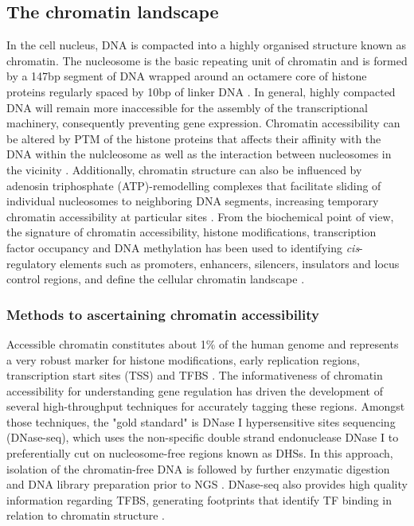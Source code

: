 \subsection{The chromatin landscape}
In the cell nucleus, DNA is compacted into a highly organised structure known as chromatin. The nucleosome is the basic repeating unit of chromatin and is formed by a 147bp segment of DNA wrapped around an octamere core of histone proteins regularly spaced by 10bp of linker DNA \parencite{Luger1997}. In general, highly compacted DNA will remain more inaccessible for the assembly of the transcriptional machinery, consequently preventing gene expression. Chromatin accessibility can be altered by PTM of the histone proteins that affects their affinity with the DNA within the nulcleosome as well as the interaction between nucleosomes in the vicinity \parencite{Polach2000,Pepenella2014}. Additionally, chromatin structure can also be influenced by adenosin triphosphate (ATP)-remodelling complexes that facilitate sliding of individual nucleosomes to neighboring DNA segments, increasing temporary chromatin accessibility at particular sites \parencite{Cosma1999}. From the biochemical point of view, the signature of chromatin accessibility, histone modifications, transcription factor occupancy and DNA methylation has been used to identifying \textit{cis}-regulatory elements such as promoters, enhancers, silencers, insulators and locus control regions, and define the cellular chromatin landscape \parencite{Boyle2012,Kundaje2015}.



\subsubsection{Methods to ascertaining chromatin accessibility}

Accessible chromatin constitutes about 1\% of the human genome and represents a very robust marker for histone modifications, early replication regions, transcription start sites (TSS) and TFBS \parencite{ENCODE2007}. The informativeness of chromatin accessibility for understanding gene regulation has driven the development of several high-throughput techniques for accurately tagging these regions. Amongst those techniques, the "gold standard" is DNase I hypersensitive sites sequencing (DNase-seq), which uses the non-specific double strand endonuclease DNase I to preferentially cut on nucleosome-free regions known as DHSs. In this approach, isolation of the chromatin-free DNA is followed by further enzymatic digestion and DNA library preparation prior to NGS \parencite{John2013}. DNase-seq also provides high quality information regarding TFBS, generating footprints that identify TF binding in relation to chromatin structure \parencite{Hesselberth2009,Boyle2010}. 

